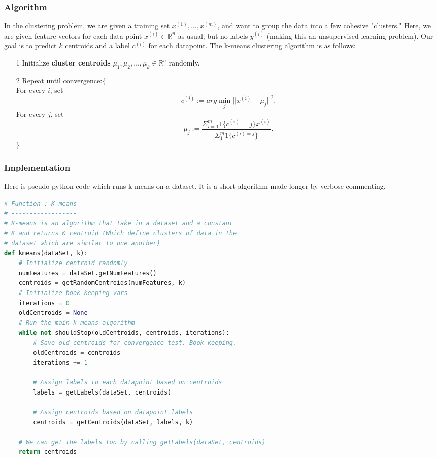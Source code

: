 \documentclass[10pt,letterpaper]{article}
\begin{document}
\subsubsection{Algorithm}
In the clustering problem, we are given a training set ${x^{(1)}, ... , x^{(m)}}$, and want to group the data into a few cohesive "clusters." Here, we are given feature vectors for each data point $x^{(i)} \in \mathbb{R}^n$ as usual; but no labels $y^{(i)}$ (making this an unsupervised learning problem). Our goal is to predict $k$ centroids and a label $c^{(i)}$ for each datapoint. The k-means clustering algorithm is as follows:

\begin{itemize}
\item[1] Initialize \textbf{cluster centroids} $\mu_{1}, \mu_{2}, \ldots , \mu_{k} \in \mathbb{R}^{n}$ randomly.
\item[2] Repeat until convergence:\big\{\\

		For every $i$, set \\
		$$c^{(i)}:= arg \min_{j}||x^{(i)}-\mu_{j}||^{2}.$$
		For every $j$, set \\
		$$\mu_{j}:= \frac{\Sigma^{m}_{i=1}1\{c^{(i)}=j\}x^{(i)}}{\Sigma^{m}_{1}1\{c^{(i)=j}\}}.$$
		\big\}
		
\end{itemize}

\subsubsection{Implementation}
Here is pseudo-python code which runs k-means on a dataset. It is a short algorithm made longer by verbose commenting.
\begin{lstlisting}[language=Python, caption=K-means Pseudo]
# Function : K-means
# ------------------
# K-means is an algorithm that take in a dataset and a constant
# K and returns K centroid (Which define clusters of data in the 
# dataset which are similar to one another)
def kmeans(dataSet, k):
	# Initialize centroid randomly
	numFeatures = dataSet.getNumFeatures()
	centroids = getRandomCentroids(numFeatures, k)
	# Initialize book keeping vars
	iterations = 0
	oldCentroids = None
    # Run the main k-means algorithm
	while not shouldStop(oldCentroids, centroids, iterations):
		# Save old centroids for convergence test. Book keeping.
		oldCentroids = centroids
		iterations += 1
		
		# Assign labels to each datapoint based on centroids
		labels = getLabels(dataSet, centroids)
		
		# Assign centroids based on datapoint labels
		centroids = getCentroids(dataSet, labels, k)
		
	# We can get the labels too by calling getLabels(dataSet, centroids)
	return centroids	
\end{lstlisting}
\end{document}
